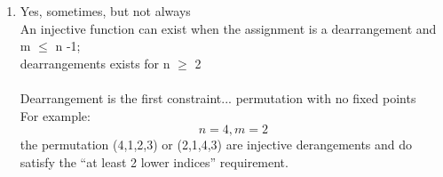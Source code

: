\documentclass[twoside]{article}
\begin{document}
\begin{enumerate}
    \item[(c)]  Yes, sometimes, but not always \\
                An injective function can exist when the assignment is a dearrangement and m $\le$ n -1; \\
                dearrangements exists for n $\ge$ 2 \\ \\
                Dearrangement is the first constraint... permutation with no fixed points \\
                For example:
                \[n = 4, m = 2\] 
                the permutation (4,1,2,3) or (2,1,4,3) are injective derangements and do satisfy the “at least 2 lower indices” requirement.

\end{enumerate}
\end{document}
